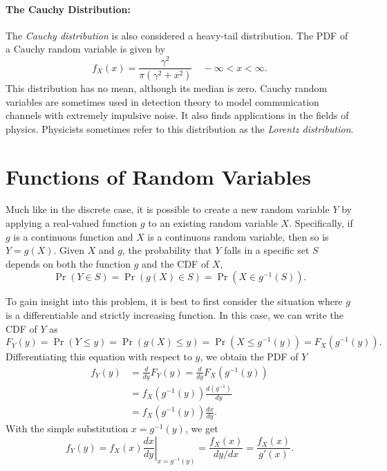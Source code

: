 \paragraph{The Cauchy Distribution:}
The \emph{Cauchy distribution} is also considered a heavy-tail distribution.
The PDF of a Cauchy random variable is given by
\begin{equation*}
f_X (x) = \frac{ \gamma^2 }{\pi \left( \gamma^2 + x^2 \right)} \quad - \infty < x < \infty.
\end{equation*}
This distribution has no mean, although its median is zero.
Cauchy random variables are sometimes used in detection theory to model communication channels with extremely impulsive noise.
It also finds applications in the fields of physics.
Physicists sometimes refer to this distribution as the \emph{Lorentz distribution}.


\section{Functions of Random Variables}

Much like in the discrete case, it is possible to create a new random variable $Y$ by applying a real-valued function $g$ to an existing random variable $X$.
Specifically, if $g$ is a continuous function and $X$ is a continuous random variable, then so is $Y = g(X)$.
Given $X$ and $g$, the probability that $Y$ falls in a specific set $S$ depends on both the function $g$ and the CDF of $X$,
\begin{equation*}
\Pr (Y \in S) = \Pr (g(X) \in S) 
= \Pr (X \in g^{-1}(S)).
\end{equation*}

To gain insight into this problem, it is best to first consider the situation where $g$ is a differentiable and strictly increasing function.
In this case, we can write the CDF of $Y$ as
\begin{equation*}
F_Y(y) = \Pr (Y \leq y) = \Pr (g(X) \leq y)
= \Pr \left( X \leq g^{-1}(y) \right)
= F_X \left( g^{-1} (y) \right) .
\end{equation*}
Differentiating this equation with respect to $y$, we obtain the PDF of $Y$
\begin{equation*}
\begin{split}
f_Y (y) &= \frac{d}{dy} F_Y(y)
= \frac{d}{dy} F_X \left( g^{-1} (y) \right) \\
&= f_X \left( g^{-1} (y) \right) \frac{d \left( g^{-1} \right)}{dy} \\
&= f_X \left( g^{-1} (y) \right) \frac{dx}{dy} .
\end{split}
\end{equation*}
With the simple substitution $x = g^{-1} (y)$, we get
\begin{equation*}
f_Y (y) = f_X (x) \left. \frac{dx}{dy} \right|_{x = g^{-1}(y)}
= \frac{f_X (x)}{{dy}/{dx}}
= \frac{f_X (x)}{g'(x)} .
\end{equation*}

